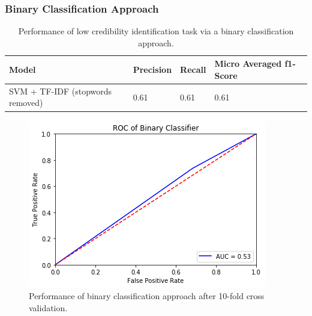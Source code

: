 \documentclass[a4paper,twoside,phd]{BYUPhys}
\begin{document}
\subsubsection{Binary Classification Approach}
\label{sec:BinaryApproachResults}

\begin{table}[H]
	\centering
		\begin{tabular}{|p{2cm}|p{2cm}|p{2cm}|p{3.5cm}|}
			\hline
			
			\textbf{Model} & \textbf{Precision} & \textbf{Recall} & \textbf{Micro Averaged \newline f1-Score}                                                                                                                                                                                                                                                                                                                                    \\
			\hline                                                                                                                                              
			SVM + \newline TF-IDF \newline (stopwords removed) & 0.61 & 0.61 & 0.61 \\
			\hline
			
			
			
	\end{tabular}
	\caption{Performance of low credibility identification task via a binary classification approach.}
	\label{table:BinaryApproach}
\end{table}

\begin{figure}[H]
	\centering
	\includegraphics[totalheight=6cm]{images/binary-roc-curve.png}
	\caption{Performance of binary classification approach after 10-fold cross validation.}
	\label{fig:BinaryPerformance}
\end{figure}
\end{document}
